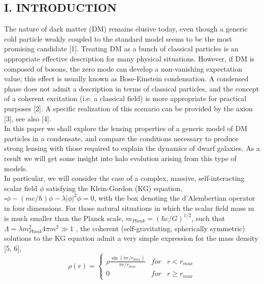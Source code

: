 \documentclass{article}
\begin{document}
\begin{multicols}{2}[]
\begin{center}
\section*{\normalsize{I. INTRODUCTION}}
\end{center}
The nature of dark matter (DM) remains elusive today,
even though a generic cold particle weakly coupled to the
standard model seems to be the most promising candidate [1]. Treating DM as a bunch of classical particles is
an appropriate effective description for many physical situations. However, if DM is composed of bosons, the zero
mode can develop a non-vanishing expectation value; this
effect is usually known as Bose-Einstein condensation. A
condensed phase does not admit a description in terms
of classical particles, and the concept of a coherent excitation (i.e. a classical field) is more appropriate for practical purposes [2]. A specific realization of this scenario
can be provided by the axion [3], see also [4].\\
In this paper we shall explore the lensing properties
of a generic model of DM particles in a condensate, and
compare the conditions necessary to produce strong lensing with those required to explain the dynamics of dwarf galaxies. As a result we will get some insight into halo
evolution arising from this type of models.\\
In particular, we will consider the case of a complex, massive, self-interacting scalar field $\phi$ satisfying
the Klein-Gordon (KG) equation, $\square \phi-(mc/\hbar)\phi-\lambda|\phi|^2\phi=0$, with the box denoting the d’Alembertian
operator in four dimensions. For those natural situations in which the scalar field mass m is much smaller
than the Planck scale, $m_{Plank}=({\hbar}c/G)^{1/2}$, such that $\Lambda={\lambda}m^2_{Plank}4{\pi}m^2\gg1$
, the coherent (self-gravitating, spherically symmetric) solutions to the KG equation admit a very simple expression for the mass density [5, 6],
\begin{equation}
   \rho{(r)}= \left\{\begin{matrix}
\rho\frac{\sin{({\pi}r/r_{max})}}{{\pi}r/r_{max}} & for & r<r_{max}\\ 
 0&for& r{\geq}r_{max}
\end{matrix}\right.
\end{equation}



\end{multicols}
\end{document}
